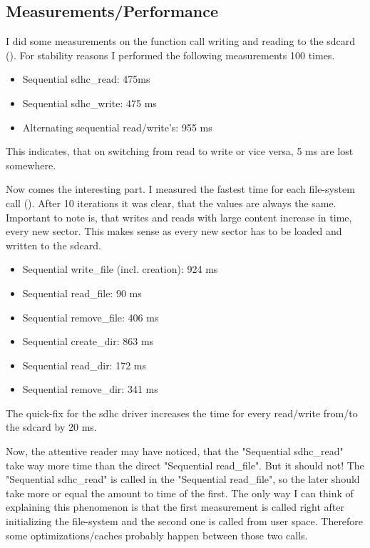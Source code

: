 \subsection{Measurements/Performance}
I did some measurements on the function call writing and reading to the sdcard (). For stability reasons I performed the following measurements 100 times.
\begin{itemize}
\item Sequential sdhc\_read: 475ms
\item Sequential sdhc\_write: 475 ms
\item Alternating sequential read/write's: 955 ms
\end{itemize}

This indicates, that on switching from read to write or vice versa, 5 ms are lost somewhere. 

Now comes the interesting part. I measured the fastest time for each file-system call (). 
After 10 iterations it was clear, that the values are always the same.
Important to note is, that writes and reads with large content increase in time, every new sector. This makes sense as every new sector has to be loaded and written to the sdcard.

\begin{itemize}
\item Sequential write\_file (incl. creation): 924 ms
\item Sequential read\_file:  90 ms
\item Sequential remove\_file: 406 ms
\item Sequential create\_dir: 863 ms
\item Sequential read\_dir: 172 ms
\item Sequential remove\_dir: 341 ms
\end{itemize}

The quick-fix for the sdhc driver increases the time for every read/write from/to the sdcard by 20 ms. 

Now, the attentive reader may have noticed, that the "Sequential sdhc\_read" take way more time than the direct "Sequential read\_file". But it should not! The "Sequential sdhc\_read" is called in the "Sequential read\_file", so the later should take more or equal the amount to time of the first. The only way I can think of explaining this phenomenon is that the first measurement is called right after initializing the file-system and the second one is called from user space. Therefore some optimizations/caches probably happen between those two calls. 

